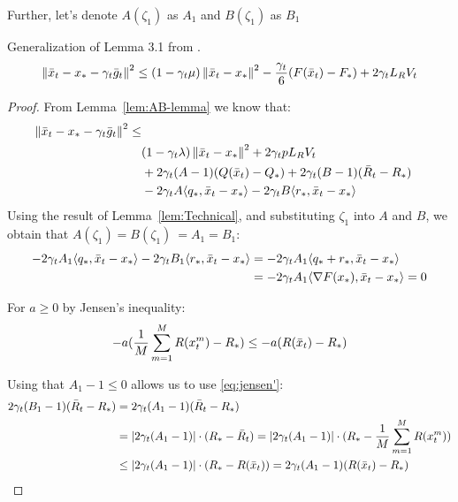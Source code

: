 Further, let's denote $A(\zeta_1)$ as $A_1$ and $B(\zeta_1)$ as $B_1$
\begin{lemma} \label{lem:main}
    Generalization of Lemma 3.1 from \cite{Stich}.
    \begin{align}
        \begin{split}
            \norm{\bar{x}_t - x_* - \gamma_{t} \bar{g}_t}^2 
            \leq (1 - \gamma_{t} \mu)\norm{\bar{x}_t - x_*}^2  - \frac{\gamma_{t}}{6} (F(\bar{x}_t) - F_*) + 2 \gamma_{t} L_R V_t
        \end{split}
    \end{align}
\end{lemma}
\begin{proof}
    From Lemma~\ref{lem:AB-lemma} we know that:
    \begin{align}
        \begin{split}
            \norm{\bar{x}_t - x_* - \gamma_{t} \bar{g}_t}^2 \leq \\
            &(1 - \gamma_{t} \lambda)\norm{\bar{x}_t - x_*}^2 + 2 \gamma_{t} p L_R V_t \\
            &+ 2\gamma_{t} (A - 1)(Q(\bar{x}_t) - Q_*)
            + 2\gamma_{t} (B - 1)(\bar{R}_t - R_*) \\
            &- 2\gamma_{t} A \inner{q_*}{\bar{x}_t - x_*}
            - 2\gamma_{t} B \inner{r_*}{\bar{x}_t - x_*} \label{eq:main}
        \end{split}
    \end{align}
    Using the result of Lemma~\ref{lem:Technical}, and substituting $\zeta_1$ into $A$ and $B$, we obtain that 
    $A(\zeta_1) = B(\zeta_1) \ = A_1 = B_1$:
    \begin{align}
        - 2\gamma_{t} A_1 \inner{q_*}{\bar{x}_t - x_*} - 2\gamma_{t} B_1 \inner{r_*}{\bar{x}_t - x_*} 
        &= - 2\gamma_{t} A_1 \inner{q_* + r_*}{\bar{x}_t - x_*} \\
        &= - 2\gamma_{t} A_1 \inner{\nabla F(x_*)}{\bar{x}_t - x_*} = 0 \label{eq:zero}
    \end{align}

    For $a \geq 0$ by Jensen's inequality:
    \begin{align}
        -a (\fsumm{m=1}{M}{R(x^m_t}) - R_*) \leq -a (R(\bar{x}_t) - R_*) \label{eq:jensen'} 
    \end{align}
    
    Using that $A_1 - 1 \leq 0$ allows us to use \eqref{eq:jensen'}:
    \begin{align}
        2\gamma_{t} (B_1 - 1)(\bar{R}_t - R_*) &= 2\gamma_{t} (A_1 - 1)(\bar{R}_t - R_*) \\
        &= |2\gamma_{t} (A_1 - 1)| \cdot (R_* - \bar{R}_t) = |2\gamma_{t} (A_1 - 1)| \cdot (R_* - \fsumm{m=1}{M}{R(x^m_t})) \\
        &\leq |2\gamma_{t} (A_1 - 1)| \cdot (R_* - R(\bar{x}_t)) = 2\gamma_{t} (A_1 - 1) (R(\bar{x}_t) - R_*) \label{eq:jensen}
    \end{align}
    

\end{proof}
